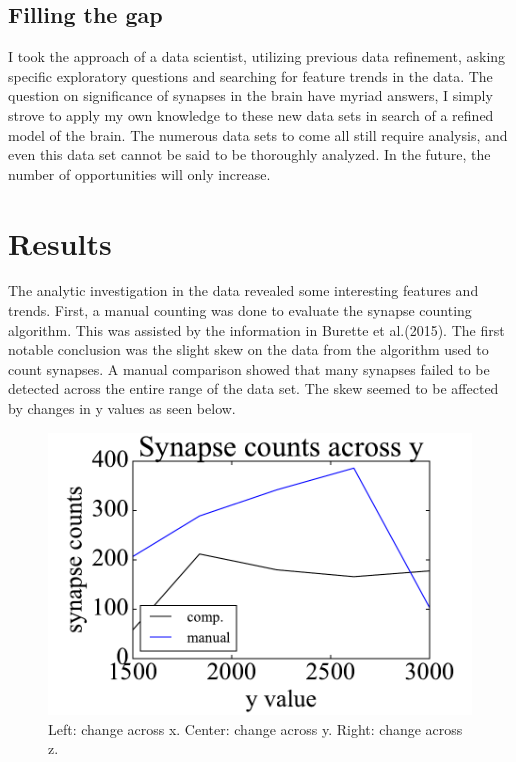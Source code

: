 \documentclass{article}
\begin{document}
\subsection{Filling the gap}

I took the approach of a data scientist, utilizing previous data refinement, asking specific exploratory questions and searching for feature trends in the data. The question on significance of synapses in the brain have myriad answers, I simply strove to apply my own knowledge to these new data sets in search of a refined model of the brain. The numerous data sets to come all still require analysis, and even this data set cannot be said to be thoroughly analyzed. In the future, the number of opportunities will only increase.

\section{Results}

The analytic investigation in the data revealed some interesting features and  trends. First, a manual counting was done to evaluate the synapse counting algorithm. This was assisted by the information in Burette et al.(2015). The first notable conclusion was the slight skew on the data from the algorithm used to count synapses. A manual comparison showed that many synapses failed to be detected across the entire range of the data set. The skew seemed to be affected by changes in y values as seen below.

\begin{figure}[h]
  \centering
  \includegraphics[scale=.3]{Fig1}
  \caption{Left: change across x. Center: change across y. Right: change across z.}
\end{figure}
\end{document}

